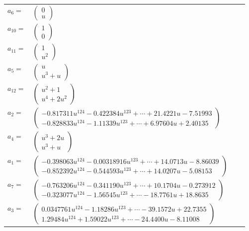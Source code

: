 \documentclass[1p]{elsarticle_modified}
\theoremstyle{definition}
\begin{document}
\begin{tabular}{m{7pt} m{180pt} m{7pt} m{180pt} }
\flushright $a_{6}=$&$\begin{pmatrix}0\\u\end{pmatrix}$ \\
\flushright $a_{10}=$&$\begin{pmatrix}1\\0\end{pmatrix}$ \\
\flushright $a_{11}=$&$\begin{pmatrix}1\\u^2\end{pmatrix}$ \\
\flushright $a_{5}=$&$\begin{pmatrix}u\\u^3+u\end{pmatrix}$ \\
\flushright $a_{12}=$&$\begin{pmatrix}u^2+1\\u^4+2 u^2\end{pmatrix}$ \\
\flushright $a_{2}=$&$\begin{pmatrix}-0.817311 u^{124}-0.422384 u^{123}+\cdots+21.4221 u-7.51993\\-0.828833 u^{124}-1.11339 u^{123}+\cdots+6.97604 u+2.40135\end{pmatrix}$ \\
\flushright $a_{4}=$&$\begin{pmatrix}u^3+2 u\\u^3+u\end{pmatrix}$ \\
\flushright $a_{1}=$&$\begin{pmatrix}-0.398063 u^{124}-0.00318916 u^{123}+\cdots+14.0713 u-8.86039\\-0.852392 u^{124}-0.544593 u^{123}+\cdots+14.0207 u-5.08153\end{pmatrix}$ \\
\flushright $a_{7}=$&$\begin{pmatrix}-0.763206 u^{124}-0.341190 u^{123}+\cdots+10.1704 u-0.273912\\-0.323077 u^{124}-1.56545 u^{123}+\cdots-18.7761 u+18.8635\end{pmatrix}$ \\
\flushright $a_{3}=$&$\begin{pmatrix}0.0347761 u^{124}-1.18286 u^{123}+\cdots-39.1572 u+22.7355\\1.29484 u^{124}+1.59022 u^{123}+\cdots-24.4400 u-8.11008\end{pmatrix}$ \\

\end{tabular}
\end{document}
